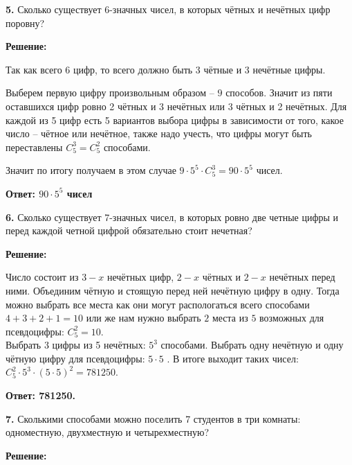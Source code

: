 \documentclass[a4paper,12pt]{article} %
\begin{document}
{\bf 5.} Сколько существует 6-значных чисел, в которых чётных и нечётных
цифр поровну?
\begin{center}
\bfseries
{\Large Решение: }
\end{center}

Так как всего 6 цифр, то всего должно быть $3$ чётные и $3$ нечётные цифры.

Выберем первую цифру произвольным образом -- $9$ способов. Значит из пяти оставшихся цифр ровно 2 чётных и 3 нечётных или 3 чётных и 2 нечётных. Для каждой из 5 цифр есть 5 вариантов выбора цифры в зависимости от того, какое число -- чётное или нечётное, также надо учесть, что цифры могут быть переставлены $C^3_5 = C^2_5$ способами.

Значит по итогу получаем в этом случае $9 \cdot 5^5 \cdot C^3_5 = 90 \cdot 5^5$ чисел.


\begin{flushright}
\begin{large}
\textbf {Ответ:  $90 \cdot 5^5$ чисел}
\end{large}
\end{flushright}

{\bf 6.} Сколько существует 7-значных чисел, в которых ровно две четные
цифры и перед каждой четной цифрой обязательно стоит нечетная?
\begin{center}
\bfseries
{\Large Решение: }
\end{center}

Число состоит из $3-x$ нечётных цифр, $2-x$ чётных и $2-x$ нечётных перед
ними.
Объединим чётную и стоящую перед ней нечётную цифру в одну. Тогда можно выбрать все места как они могут распологаться всего способами $4+3+2+1 = 10$ или же нам нужно выбрать $2$ места из $5$ возможных для псевдоцифры: $C^2_5 = 10$. \\
Выбрать 3 цифры из 5 нечётных: $5^3$ способами. Выбрать одну нечётную и одну чётную цифру для псевдоцифры: $5 \cdot 5$ . В итоге выходит таких чисел: $C^2_5 \cdot 5^3 \cdot (5 \cdot 5)^2 = 781250$.

\begin{flushright}
\begin{large}
\textbf {Ответ: 781250.}
\end{large}
\end{flushright}

{\bf 7.} Сколькими способами можно поселить 7 студентов в три комнаты:
одноместную, двухместную и четырехместную?
\begin{center}
\bfseries
{\Large Решение: }
\end{center}
\end{document}
